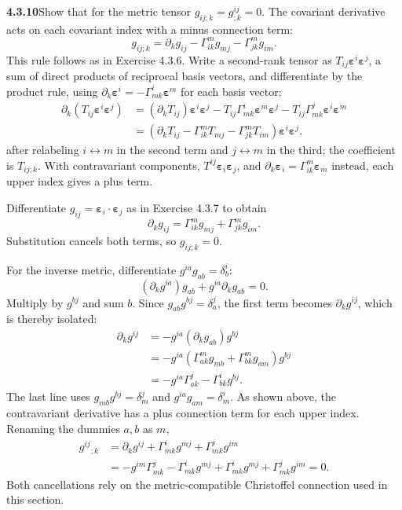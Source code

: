 \par\bigskip
\noindent\textbf{4.3.10}\quad Show that for the metric tensor
$g_{ij;k}=g^{ij}_{;k}=0$.
\solution
The covariant derivative acts on each covariant index with a
minus connection term:
\[
g_{ij;k}=\partial_kg_{ij}
 -\Gamma^m_{ik}g_{mj}-\Gamma^m_{jk}g_{im}.
\]
This rule follows as in Exercise 4.3.6. Write a second-rank tensor as
$T_{ij}\boldsymbol\varepsilon^i\boldsymbol\varepsilon^j$, a sum of
direct products of reciprocal basis vectors, and differentiate by the
product rule, using
$\partial_k\boldsymbol\varepsilon^i=-\Gamma^i_{mk}\boldsymbol\varepsilon^m$
for each basis vector:
\begin{align*}
\partial_k(T_{ij}\boldsymbol\varepsilon^i\boldsymbol\varepsilon^j)
&=(\partial_kT_{ij})\boldsymbol\varepsilon^i\boldsymbol\varepsilon^j
 -T_{ij}\Gamma^i_{mk}\boldsymbol\varepsilon^m\boldsymbol\varepsilon^j
 -T_{ij}\Gamma^j_{mk}\boldsymbol\varepsilon^i\boldsymbol\varepsilon^m\\
&=(\partial_kT_{ij}-\Gamma^m_{ik}T_{mj}-\Gamma^m_{jk}T_{im})
 \boldsymbol\varepsilon^i\boldsymbol\varepsilon^j,
\end{align*}
after relabeling $i\leftrightarrow m$ in the second term and
$j\leftrightarrow m$ in the third; the coefficient is $T_{ij;k}$. With
contravariant components, $T^{ij}\boldsymbol\varepsilon_i
\boldsymbol\varepsilon_j$, and
$\partial_k\boldsymbol\varepsilon_i=\Gamma^m_{ik}\boldsymbol\varepsilon_m$
instead, each upper index gives a plus term.

Differentiate $g_{ij}=\boldsymbol\varepsilon_i\cdot
\boldsymbol\varepsilon_j$ as in Exercise 4.3.7 to obtain
\[
\partial_kg_{ij}=\Gamma^m_{ik}g_{mj}+\Gamma^m_{jk}g_{im}.
\]
Substitution cancels both terms, so $\boxed{g_{ij;k}=0}$.

For the inverse metric, differentiate $g^{ia}g_{ab}=\delta^i_b$:
\[
(\partial_kg^{ia})g_{ab}+g^{ia}\partial_kg_{ab}=0.
\]
Multiply by $g^{bj}$ and sum $b$. Since $g_{ab}g^{bj}=\delta^j_a$, the
first term becomes $\partial_kg^{ij}$, which is thereby isolated:
\begin{align*}
\partial_kg^{ij}
&=-g^{ia}(\partial_kg_{ab})g^{bj}\\
&=-g^{ia}(\Gamma^m_{ak}g_{mb}+\Gamma^m_{bk}g_{am})g^{bj}\\
&=-g^{ia}\Gamma^j_{ak}-\Gamma^i_{bk}g^{bj}.
\end{align*}
The last line uses $g_{mb}g^{bj}=\delta^j_m$ and
$g^{ia}g_{am}=\delta^i_m$. As shown above, the contravariant derivative
has a plus connection term for each upper index. Renaming the dummies
$a,b$ as $m$,
\begin{align*}
g^{ij}{}_{;k}
&=\partial_kg^{ij}+\Gamma^i_{mk}g^{mj}+\Gamma^j_{mk}g^{im}\\
&=-g^{im}\Gamma^j_{mk}-\Gamma^i_{mk}g^{mj}
  +\Gamma^i_{mk}g^{mj}+\Gamma^j_{mk}g^{im}=0.
\end{align*}
Both cancellations rely on the metric-compatible Christoffel
connection used in this section.

